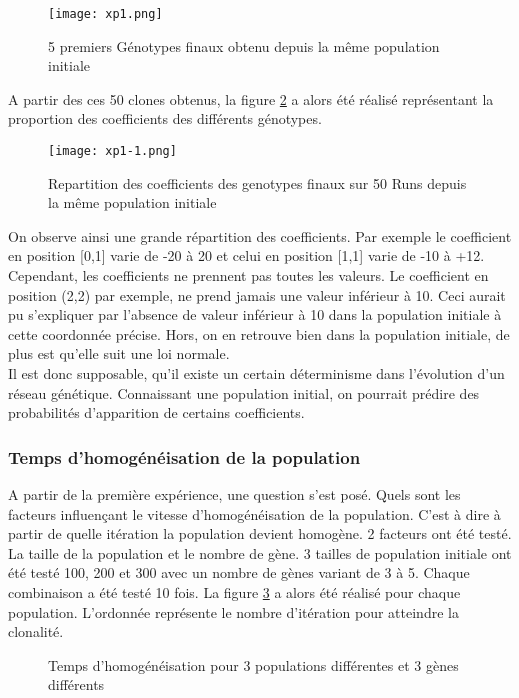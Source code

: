 \documentclass{article}
\begin{document}
	\begin{figure}[h]
	\caption[test]{5 premiers Génotypes finaux obtenu depuis la même population initiale}
	\centering
	\texttt{[image: xp1.png]}
	\label{xp1}
	\end{figure}

	A partir des ces 50 clones obtenus, la figure \ref{xp1.1} a alors été réalisé représentant la proportion des coefficients des différents génotypes.

	\begin{figure}[h]
	\centering
	\caption[test]{Repartition des coefficients des genotypes finaux sur 50 Runs depuis la même population initiale}
	\texttt{[image: xp1-1.png]}
	\label{xp1.1}
	\end{figure}

	On observe ainsi une grande répartition des coefficients. Par exemple le coefficient en position [0,1] varie de -20 à 20 et celui en position [1,1] varie de -10 à +12. Cependant, les coefficients ne prennent pas toutes les valeurs. Le coefficient en position (2,2) par exemple, ne prend jamais une valeur inférieur à 10. Ceci aurait pu s'expliquer par l'absence de valeur inférieur à 10 dans la population initiale à cette coordonnée précise. Hors, on en retrouve bien dans la population initiale, de plus est qu'elle suit une loi normale. \\ 
	Il est donc supposable, qu'il existe un certain déterminisme dans l’évolution d'un réseau génétique. Connaissant une population initial, on pourrait prédire des probabilités d'apparition de certains coefficients. 

	\subsubsection{ Temps d’homogénéisation de la population}
	A partir de la première expérience, une question s'est posé. Quels sont les facteurs influençant le vitesse d'homogénéisation de la population. C'est à dire à partir de quelle itération la population devient homogène. 
	2 facteurs ont été testé. La taille de la population et le nombre de gène. 3 tailles de population initiale ont été testé 100, 200 et 300 avec un nombre de gènes variant de 3 à 5. Chaque combinaison a été testé 10 fois. La figure \ref{xp2} a alors été réalisé pour chaque population. L'ordonnée représente le nombre d’itération pour atteindre la clonalité. 

	\begin{figure}[h]
	\centering
	\null\hfill
	\hfill
	\hfill
	\hfill
	\caption{Temps d’homogénéisation pour 3 populations différentes et 3 gènes différents}
	\label{xp2}
	\end{figure}
\end{document}
